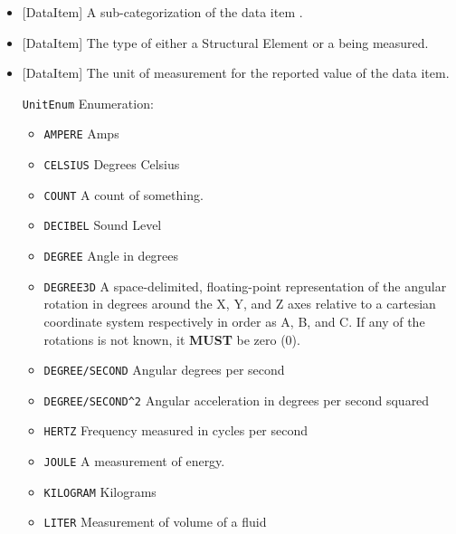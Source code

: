 \begin{itemize}
\item {}[DataItem] \newline A sub-categorization of the data item .

\item {}[DataItem] \newline The type of either a \gls{Structural Element} or a  being measured.

\item {}[DataItem] \newline The unit of measurement for the reported value of the data item.

\texttt{UnitEnum} Enumeration:

\begin{itemize}
\item \texttt{AMPERE} \newline Amps 
\item \texttt{CELSIUS} \newline Degrees Celsius 
\item \texttt{COUNT} \newline A count of something. 
\item \texttt{DECIBEL} \newline Sound Level 
\item \texttt{DEGREE} \newline Angle in degrees 
\item \texttt{DEGREE\textunderscore 3D} \newline A space-delimited, floating-point representation of the angular rotation in degrees around the X, Y, and Z axes relative to a cartesian coordinate system respectively in order as A, B, and C. If any of the rotations is not known, it \textbf{MUST} be zero (0). 
\item \texttt{DEGREE/SECOND} \newline Angular degrees per second 
\item \texttt{DEGREE/SECOND\^{}2} \newline Angular acceleration in degrees per second squared 
\item \texttt{HERTZ} \newline Frequency measured in cycles per second 
\item \texttt{JOULE} \newline A measurement of energy. 
\item \texttt{KILOGRAM} \newline Kilograms 
\item \texttt{LITER} \newline Measurement of volume of a fluid 

\end{itemize}
\end{itemize}
